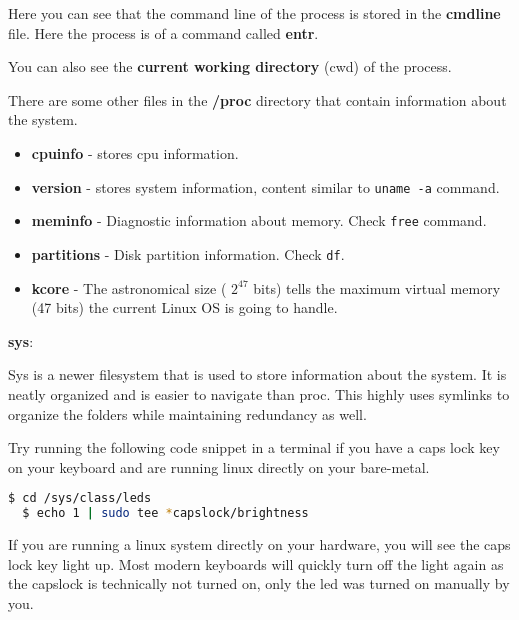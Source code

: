 Here you can see that the command line of the process is stored in the \textbf{cmdline} file.
Here the process is of a command called \textbf{entr}.

You can also see the \textbf{current working directory} (cwd) of the process.

There are some other files in the \textbf{/proc} directory that contain information about the system.

\begin{itemize}
  \item \textbf{cpuinfo} - stores cpu information.
  \item \textbf{version} - stores system information, content similar to \lstinline|uname -a| command.
  \item \textbf{meminfo} - Diagnostic information about memory. Check \lstinline|free| command.
  \item \textbf{partitions} - Disk partition information. Check \lstinline|df|.
  \item \textbf{kcore} - The astronomical size ( $2^{47}$ bits) tells the maximum virtual memory (47 bits) the current Linux OS is going to handle.
\end{itemize}

\textbf{sys}:

Sys is a newer filesystem that is used to store information about the system.
It is neatly organized and is easier to navigate than proc.
This highly uses symlinks to organize the folders while maintaining redundancy as well.

Try running the following code snippet in a terminal if you have a caps lock key on your keyboard and are running linux directly on your bare-metal.

\begin{lstlisting}[language=bash]
  $ cd /sys/class/leds
  $ echo 1 | sudo tee *capslock/brightness
\end{lstlisting}

If you are running a linux system directly on your hardware, you will see the caps lock key light up.
Most modern keyboards will quickly turn off the light again as the capslock is technically not turned on, only the led was turned on manually by you.


